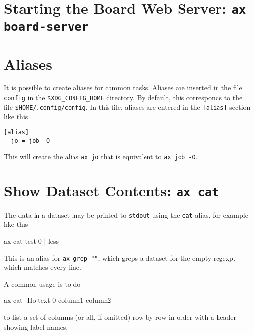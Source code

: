 \section{Starting the Board Web Server: \texttt{ax board-server}}



\section{Aliases}
It is possible to create aliases for common tasks.  Aliases are
inserted in the file \texttt{config} in the \texttt{\$XDG\_CONFIG\_HOME}
directory.  By default, this corresponds to the file \texttt{\$HOME/.config/config}.
In this file, aliases are entered in the \texttt{[alias]} section like this
\begin{verbatim}
[alias]
  jo = job -O
\end{verbatim}
This will create the alias \texttt{ax jo} that is equivalent to
\texttt{ax job -O}.



\section{Show Dataset Contents: \texttt{ax cat}}
The data in a dataset may be printed to \texttt{stdout} using the
\texttt{cat} alias, for example like this
\begin{shell}
ax cat test-0 | less
\end{shell}
This is an alias for \texttt{ax grep ""}, which greps a dataset for the
empty regexp, which matches every line.

A common usage is to do
\begin{shell}
ax cat -Ho text-0 column1 column2
\end{shell}
to list a set of columns (or all, if omitted) row by row in order with
a header showing label names.



